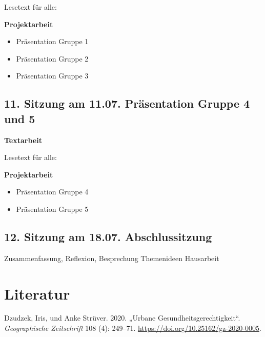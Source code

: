 \documentclass[
  ngerman,
]{article}
\providecommand{\tightlist}{%
  \setlength{\itemsep}{0pt}\setlength{\parskip}{0pt}}
\newlength{\cslhangindent}
\newlength{\cslentryspacingunit} %
\newenvironment{CSLReferences}[2] %
 {%
  \setlength{\parindent}{0pt}
  \ifodd #1
  \let\oldpar\par
  \def\par{\hangindent=\cslhangindent\oldpar}
  \fi
  \setlength{\parskip}{#2\cslentryspacingunit}
 }%
 {}
\begin{document}
Lesetext für alle:

\textbf{Projektarbeit}

\begin{itemize}
\tightlist
\item
  Präsentation Gruppe 1
\item
  Präsentation Gruppe 2
\item
  Präsentation Gruppe 3
\end{itemize}

\hypertarget{sitzung-am-11.07.-pruxe4sentation-gruppe-4-und-5}{%
\subsection*{11. Sitzung am 11.07. \textbar{} Präsentation Gruppe 4 und 5}\label{sitzung-am-11.07.-pruxe4sentation-gruppe-4-und-5}}

\textbf{Textarbeit}

Lesetext für alle:

\textbf{Projektarbeit}

\begin{itemize}
\tightlist
\item
  Präsentation Gruppe 4
\item
  Präsentation Gruppe 5
\end{itemize}

\hypertarget{sitzung-am-18.07.-abschlussitzung}{%
\subsection*{12. Sitzung am 18.07. \textbar{} Abschlussitzung}\label{sitzung-am-18.07.-abschlussitzung}}

Zusammenfassung, Reflexion, Besprechung Themenideen Hausarbeit

\hypertarget{literatur}{%
\section*{Literatur}\label{literatur}}

\hypertarget{refs}{}
\begin{CSLReferences}{1}{0}
\leavevmode{}%
Dzudzek, Iris, und Anke Strüver. 2020. {„Urbane Gesundheitsgerechtigkeit``}. \emph{Geographische Zeitschrift} 108 (4): 249--71. \url{https://doi.org/10.25162/gz-2020-0005}.

\end{CSLReferences}
\end{document}
